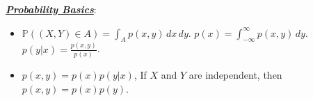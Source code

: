 \documentclass[10pt]{article}
\newcommand{\bulletPoint}[1]{\ul{\textit{\textbf{#1}}}}
\begin{document}
\singlespacing
\begin{multicols*}{3}
\scriptsize
\raggedright




\bulletPoint{Probability Basics}:

\begin{itemize}[label=$\cdot$,leftmargin=0pt]
\item$\mathbb{P}((X,Y) \in A) = \int_A p(x,y) \,dx\,dy$. \quad
$p(x) = \int_{-\infty}^{\infty} p(x,y) \,dy$.\quad
$p(y | x) = \frac{p(x,y)}{p(x)}$.
\item$p(x,y) = p(x)p(y | x)$, 
If \(X\) and \(Y\) are independent, then \( p(x,y) = p(x)p(y) \).


\end{itemize}
\end{multicols*}
\end{document}
